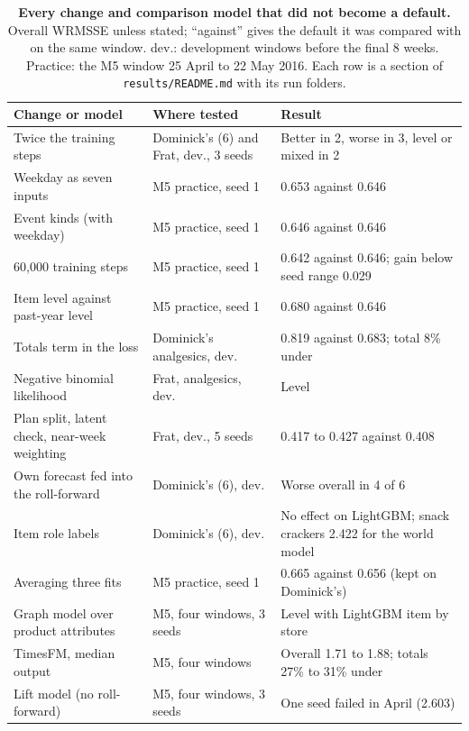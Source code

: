 \begin{table}[t]
\centering
\caption{\textbf{Every change and comparison model that did not become a default.} Overall WRMSSE unless
stated; ``against'' gives the default it was compared with on the same window. dev.: development windows before
the final 8 weeks. Practice: the M5 window 25 April to 22 May 2016. Each row is a section of
\texttt{results/README.md} with its run folders.}
\label{tab:ledger}
\footnotesize
\begin{tabular}{p{}p{}p{}}
\toprule
\textbf{Change or model} & \textbf{Where tested} & \textbf{Result} \\
\midrule
Twice the training steps & Dominick's (6) and Frat, dev., 3 seeds & Better in 2, worse in 3, level or mixed in 2 \\
Weekday as seven inputs & M5 practice, seed 1 & 0.653 against 0.646 \\
Event kinds (with weekday) & M5 practice, seed 1 & 0.646 against 0.646 \\
60,000 training steps & M5 practice, seed 1 & 0.642 against 0.646; gain below seed range 0.029 \\
Item level against past-year level & M5 practice, seed 1 & 0.680 against 0.646 \\
Totals term in the loss & Dominick's analgesics, dev. & 0.819 against 0.683; total 8\% under \\
Negative binomial likelihood & Frat, analgesics, dev. & Level \\
Plan split, latent check, near-week weighting & Frat, dev., 5 seeds & 0.417 to 0.427 against 0.408 \\
Own forecast fed into the roll-forward & Dominick's (6), dev. & Worse overall in 4 of 6 \\
Item role labels & Dominick's (6), dev. & No effect on LightGBM; snack crackers 2.422 for the world model \\
Averaging three fits & M5 practice, seed 1 & 0.665 against 0.656 (kept on Dominick's) \\
Graph model over product attributes & M5, four windows, 3 seeds & Level with LightGBM item by store \\
TimesFM, median output & M5, four windows & Overall 1.71 to 1.88; totals 27\% to 31\% under \\
Lift model (no roll-forward) & M5, four windows, 3 seeds & One seed failed in April (2.603) \\
\bottomrule
\end{tabular}
\end{table}
